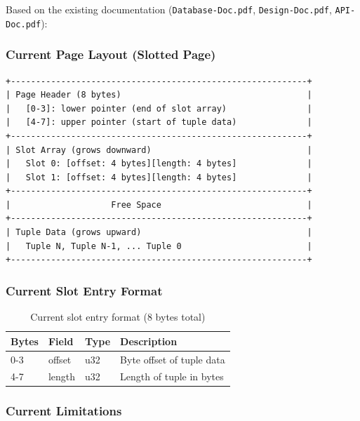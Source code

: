 \documentclass[11pt,a4paper]{article}
\begin{document}
Based on the existing documentation (\texttt{Database-Doc.pdf}, \texttt{Design-Doc.pdf}, \texttt{API-Doc.pdf}):

\subsubsection{Current Page Layout (Slotted Page)}

\begin{lstlisting}
+-----------------------------------------------------------+
| Page Header (8 bytes)                                     |
|   [0-3]: lower pointer (end of slot array)                |
|   [4-7]: upper pointer (start of tuple data)              |
+-----------------------------------------------------------+
| Slot Array (grows downward)                               |
|   Slot 0: [offset: 4 bytes][length: 4 bytes]              |
|   Slot 1: [offset: 4 bytes][length: 4 bytes]              |
+-----------------------------------------------------------+
|                    Free Space                             |
+-----------------------------------------------------------+
| Tuple Data (grows upward)                                 |
|   Tuple N, Tuple N-1, ... Tuple 0                         |
+-----------------------------------------------------------+
\end{lstlisting}

\subsubsection{Current Slot Entry Format}

\begin{table}[H]
\centering
\begin{tabular}{@{}llll@{}}
\toprule
\textbf{Bytes} & \textbf{Field} & \textbf{Type} & \textbf{Description} \\
\midrule
0-3 & offset & u32 & Byte offset of tuple data \\
4-7 & length & u32 & Length of tuple in bytes \\
\bottomrule
\end{tabular}
\caption{Current slot entry format (8 bytes total)}
\end{table}

\subsubsection{Current Limitations}
\end{document}
